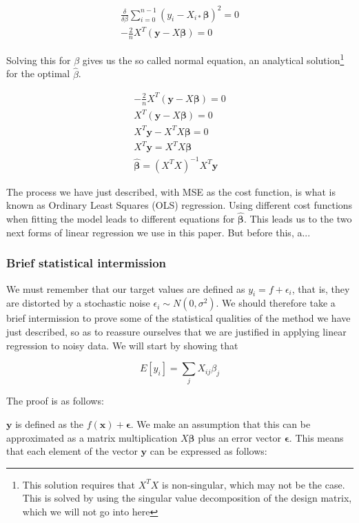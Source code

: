 \documentclass[twocolumn,10pt,cleanfoot]{asme2ej}
\begin{document}
\begin{gather}
\frac{\delta}{\delta \beta} \sum_{i=0}^{n-1}(y_i-X_{i*}\bm{\beta})^2 = 0 \\
 - \frac{2}{n} X^T(\bm{y} - X\bm{\beta}) = 0
\end{gather}

Solving this for $\beta$ gives us the so called normal equation, an analytical solution\footnote{This solution requires that $X^TX$ is non-singular, which may not be the case. This is solved by using the singular value decomposition of the design matrix, which we will not go into here} for the optimal $\hat{\beta}$.

\begin{gather}
- \frac{2}{n} X^T(\bm{y} - X\bm{\beta}) = 0 \\
X^T(\bm{y} - X\bm{\beta}) = 0 \\
X^T\bm{y} - X^TX\bm{\beta} = 0 \\
X^T\bm{y} = X^TX\bm{\beta} \\
\bm{\hat{\beta}} = (X^TX)^{-1}X^T\bm{y}
\end{gather}

The process we have just described, with MSE as the cost function, is what is known as Ordinary Least Squares (OLS) regression. Using different cost functions when fitting the model leads to different equations for $\bm{\hat{\beta}}$. This leads us to the two next forms of linear regression we use in this paper. But before this, a...

\subsubsection{Brief statistical intermission}

We must remember that our target values are defined as $y_i = f + \epsilon_i$, that is, they are distorted by a stochastic noise $\epsilon_i \sim N(0,\sigma^2)$. We should therefore take a brief intermission to prove some of the statistical qualities of the method we have just described, so as to reassure ourselves that we are justified in applying linear regression to noisy data. We will start by showing that

\begin{equation}
E[y_i] = \sum_j X_{ij}\beta_j
\end{equation}

The proof is as follows:

$\bm{y}$ is defined as the $f(\bm{x}) + \bm{\epsilon}$. We make an assumption that this can be approximated as a matrix multiplication $X\bm{\beta}$ plus an error vector $\bm{\epsilon}$. This means that each element of the vector
$\bm{y}$ can be expressed as follows:
\end{document}
